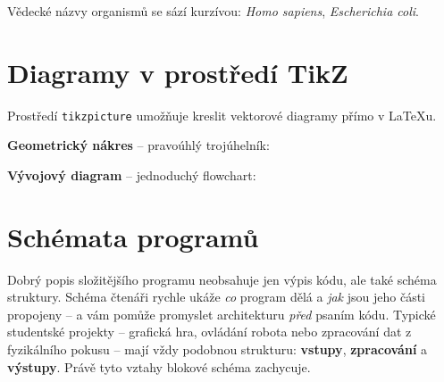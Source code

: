 \documentclass[12pt]{report}
\begin{document}
Vědecké názvy organismů se sází kurzívou: \textit{Homo sapiens}, \textit{Escherichia coli}.

\section{Diagramy v prostředí TikZ}

Prostředí \texttt{tikzpicture} umožňuje kreslit vektorové diagramy přímo v \LaTeX{}u.

\textbf{Geometrický nákres} – pravoúhlý trojúhelník:
\begin{center}
\end{center}

\textbf{Vývojový diagram} – jednoduchý flowchart:
\begin{center}
\end{center}

\section{Schémata programů}

Dobrý popis složitějšího programu neobsahuje jen výpis kódu, ale také schéma struktury.
Schéma čtenáři rychle ukáže \emph{co} program dělá a \emph{jak} jsou jeho části propojeny
-- a vám pomůže promyslet architekturu \emph{před} psaním kódu.
Typické studentské projekty -- grafická hra, ovládání robota nebo zpracování dat
z fyzikálního pokusu -- mají vždy podobnou strukturu:
\textbf{vstupy}, \textbf{zpracování} a \textbf{výstupy}.
Právě tyto vztahy blokové schéma zachycuje.
\end{document}
